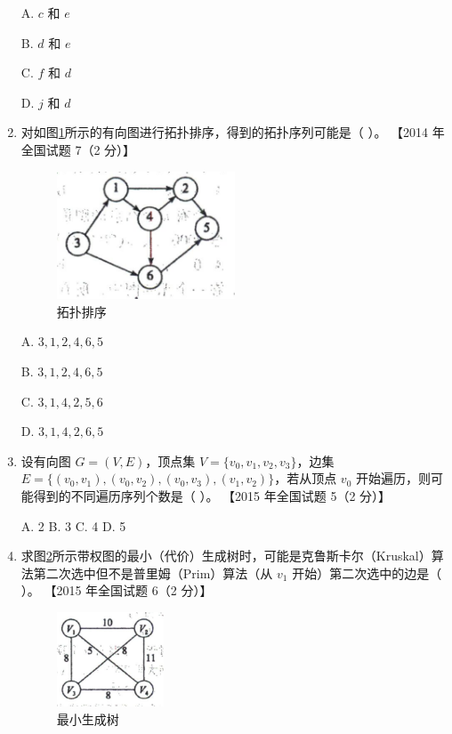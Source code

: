 \documentclass[lang=cn,newtx,10pt,scheme=chinese]{elegantbook}
\begin{document}
\begin{enumerate}
        A. $c$ 和 $e$  

        B. $d$ 和 $e$  

        C. $f$ 和 $d$  

        D. $j$ 和 $d$  
    
        \item 对如图\ref{fig:7-19}所示的有向图进行拓扑排序，得到的拓扑序列可能是（ ）。  
        【2014 年全国试题 7（2 分）】  

        \begin{figure}[h!]
            \centering
            \includegraphics[width=0.5\textwidth]{./figure/exercisePicPDF/chapter7/7-19.pdf}
            \caption{拓扑排序}
            \label{fig:7-19}
    \end{figure}

        A. $3, 1, 2, 4, 6, 5$  

        B. $3, 1, 2, 4, 6, 5$  

        C. $3, 1, 4, 2, 5, 6$  

        D. $3, 1, 4, 2, 6, 5$  
    
        \item 设有向图 $G = (V, E)$，顶点集 $V = \{v_0,v_1, v_2, v_3\}$，边集 $E = \{(v_0, v_1), (v_0, v_2), (v_0, v_3),(v_1,v_2)\}$，若从顶点 $v_0$ 开始遍历，则可能得到的不同遍历序列个数是（ ）。  
        【2015 年全国试题 5（2 分）】  

        A. 2 \quad B. 3 \quad C. 4 \quad D. 5  
    
        \item 求图\ref{fig:7-21}所示带权图的最小（代价）生成树时，可能是克鲁斯卡尔（Kruskal）算法第二次选中但不是普里姆（Prim）算法（从 $v_1$ 开始）第二次选中的边是（ ）。  
        【2015 年全国试题 6（2 分）】  

        \begin{figure}[h!]
            \centering
            \includegraphics[width=0.3\textwidth]{./figure/exercisePicPDF/chapter7/7-21.pdf}
            \caption{最小生成树}
            \label{fig:7-21}
        \end{figure}


\end{enumerate}
\end{document}
